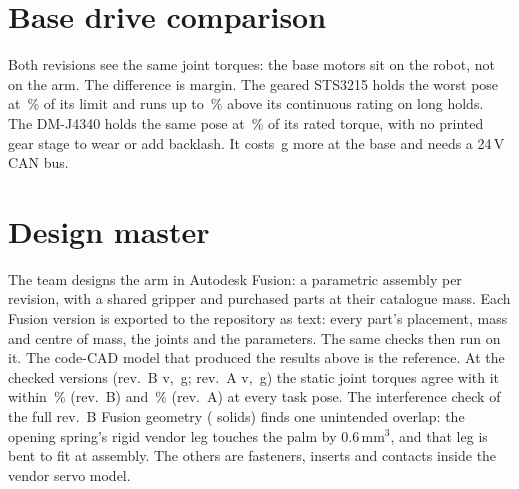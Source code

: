 \documentclass[10pt]{article}
\begin{document}
\section{Base drive comparison}\label{sec:base}
Both revisions see the same joint torques: the base motors sit on the robot, not on the arm. The difference is
margin. The geared STS3215 holds the worst pose at \JOneUtilG\,\% of its limit and runs up to \JOneOverRated\,\% above its
continuous rating on long holds. The DM-J4340 holds the same pose at \JOneUtilD\,\% of its rated torque, with no
printed gear stage to wear or add backlash. It costs \DirectExtra\,g more at the base and
needs a 24\,V CAN bus.

\section{Design master}\label{sec:fusion}
The team designs the arm in Autodesk Fusion: a parametric assembly per revision, with a shared gripper and purchased
parts at their catalogue mass. Each Fusion version is exported to the repository as text: every part's placement,
mass and centre of mass, the joints and the parameters. The same checks then run on it. The code-CAD model that
produced the results above is the reference. At the checked versions (rev.~B v\FusionVerB, \FusionMassB\,g; rev.~A
v\FusionVerA, \FusionMassA\,g) the static joint torques agree with it within \FusionTqDiffB\,\% (rev.~B) and
\FusionTqDiffA\,\% (rev.~A) at every task pose. The interference check of the full rev.~B Fusion geometry
(\FusionSolids{} solids) finds one unintended overlap: the opening spring's rigid vendor leg touches the palm by
0.6\,mm$^3$, and that leg is bent to fit at assembly. The others are fasteners, inserts and contacts inside the vendor
servo model.
\end{document}

